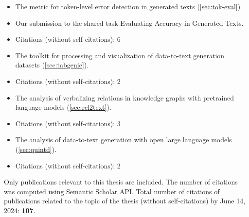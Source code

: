 \noindent{}
\begin{itemize}[noitemsep,topsep=0pt]
    \item The metric for token-level error detection in generated texts (\autoref{sec:tok-eval})
    \item Our submission to the shared task Evaluating Accuracy in Generated Texts.
    \item Citations (without self-citations): 6

\end{itemize}\vspace{.5\baselineskip}


\noindent{}
\begin{itemize}[noitemsep,topsep=0pt]

    \item The toolkit for processing and visualization of data-to-text generation datasets (\autoref{sec:tabgenie}).
    \item Citations (without self-citations): 2

\end{itemize}\vspace{.5\baselineskip}


\noindent{}
\begin{itemize}[noitemsep,topsep=0pt]

    \item The analysis of verbalizing relations in knowledge graphs with pretrained language models (\autoref{sec:rel2text}).
    \item Citations (without self-citations): 3

\end{itemize}\vspace{.5\baselineskip}


\noindent{}
\begin{itemize}[noitemsep,topsep=0pt]

    \item The analysis of data-to-text generation with open large language models (\autoref{sec:quintd}).
    \item Citations (without self-citations): 2

\end{itemize}\vspace{.5\baselineskip}

\vfill

\noindent Only publications relevant to this thesis are included. The number of
citations was computed using Semantic Scholar API. Total number of citations of
publications related to the topic of the thesis (without self-citations) by June 14, 2024: {\bf 107}.
